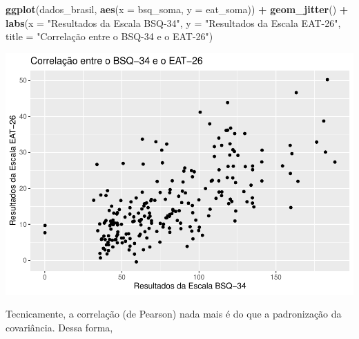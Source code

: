\documentclass[
]{book}
\newenvironment{Shaded}{\begin{snugshade}}{\end{snugshade}}
\newcommand{\DataTypeTok}[1]{\textcolor[rgb]{0.13,0.29,0.53}{#1}}
\newcommand{\KeywordTok}[1]{\textcolor[rgb]{0.13,0.29,0.53}{\textbf{#1}}}
\newcommand{\NormalTok}[1]{#1}
\newcommand{\OperatorTok}[1]{\textcolor[rgb]{0.81,0.36,0.00}{\textbf{#1}}}
\newcommand{\StringTok}[1]{\textcolor[rgb]{0.31,0.60,0.02}{#1}}
\begin{document}
\begin{Shaded}
\begin{Highlighting}[]
\KeywordTok{ggplot}\NormalTok{(dados_brasil, }\KeywordTok{aes}\NormalTok{(}\DataTypeTok{x =}\NormalTok{ bsq_soma, }\DataTypeTok{y =}\NormalTok{ eat_soma)) }\OperatorTok{+}
\StringTok{  }\KeywordTok{geom_jitter}\NormalTok{() }\OperatorTok{+}
\StringTok{  }\KeywordTok{labs}\NormalTok{(}\DataTypeTok{x =} \StringTok{"Resultados da Escala BSQ-34"}\NormalTok{, }\DataTypeTok{y =} \StringTok{"Resultados da Escala EAT-26"}\NormalTok{, }
       \DataTypeTok{title =} \StringTok{"Correlação entre o BSQ-34 e o EAT-26"}\NormalTok{)}
\end{Highlighting}
\end{Shaded}

\begin{center}\includegraphics{gitbook-demo_files/figure-latex/unnamed-chunk-79-1} \end{center}

Tecnicamente, a correlação (de Pearson) nada mais é do que a padronização da covariância. Dessa forma,

\begin{Shaded}
\end{Shaded}
\end{document}
